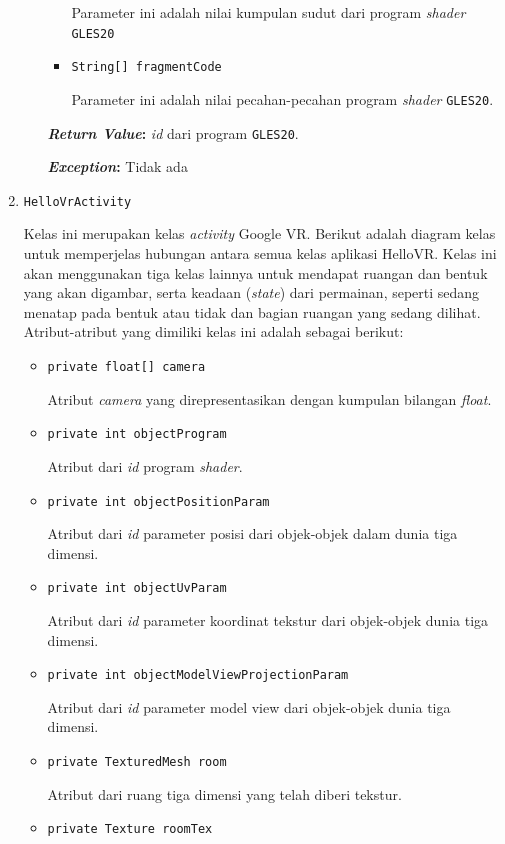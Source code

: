 \begin{enumerate}
\begin{itemize}
\begin{itemize}
			Parameter ini adalah nilai kumpulan sudut dari program \textit{shader} \texttt{GLES20}	
			\item \texttt{String[] fragmentCode}
			
			Parameter ini adalah nilai pecahan-pecahan program \textit{shader} \texttt{GLES20}.		
		\end{itemize}
		\textbf{\textit{Return Value}:} \textit{id} dari program \texttt{GLES20}.
			
		\textbf{\textit{Exception}:} Tidak ada
	\end{itemize}
	
	
	\item \texttt{HelloVrActivity}
	
	Kelas ini merupakan kelas {\it activity} Google VR. Berikut adalah diagram kelas untuk memperjelas hubungan antara semua kelas aplikasi HelloVR. Kelas ini akan menggunakan tiga kelas lainnya untuk mendapat ruangan dan bentuk yang akan digambar, serta keadaan ({\it state}) dari permainan, seperti sedang menatap pada bentuk atau tidak dan bagian ruangan yang sedang dilihat. Atribut-atribut yang dimiliki kelas ini adalah sebagai berikut:

	\begin{itemize}
  		\item \texttt{private float[] camera}
  		
  		Atribut \textit{camera} yang direpresentasikan dengan kumpulan bilangan \textit{float}.
  		\item \texttt{private int objectProgram}
  		
  		Atribut dari \textit{id} program \textit{shader}.
  		\item \texttt{private int objectPositionParam}
  		
  		Atribut dari \textit{id} parameter posisi dari objek-objek dalam dunia tiga dimensi.
  		\item \texttt{private int objectUvParam}
  		
  		Atribut dari \textit{id} parameter koordinat tekstur dari objek-objek dunia tiga dimensi.
  		\item \texttt{private int objectModelViewProjectionParam}
  		
  		Atribut dari \textit{id} parameter model view dari objek-objek dunia tiga dimensi.
  		\item \texttt{private TexturedMesh room}
  		
  		Atribut dari ruang tiga dimensi yang telah diberi tekstur.
  		\item \texttt{private Texture roomTex}
  		

\end{itemize}
\end{enumerate}
